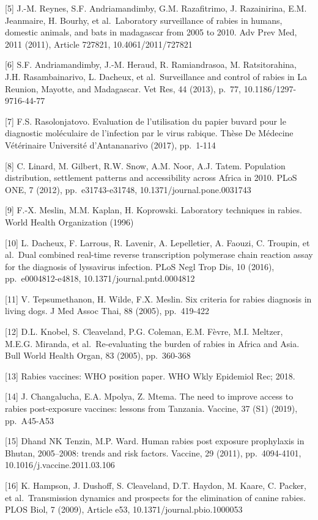 \documentclass[
  oneside]{book}
\begin{document}
{[}5{]} J.-M. Reynes, S.F. Andriamandimby, G.M. Razafitrimo, J. Razainirina, E.M. Jeanmaire, H. Bourhy, et al.~Laboratory surveillance of rabies in humans, domestic animals, and bats in madagascar from 2005 to 2010. Adv Prev Med, 2011 (2011), Article 727821, 10.4061/2011/727821

{[}6{]} S.F. Andriamandimby, J.-M. Heraud, R. Ramiandrasoa, M. Ratsitorahina, J.H. Rasambainarivo, L. Dacheux, et al.~Surveillance and control of rabies in La Reunion, Mayotte, and Madagascar. Vet Res, 44 (2013), p.~77, 10.1186/1297-9716-44-77

{[}7{]} F.S. Rasolonjatovo. Evaluation de l'utilisation du papier buvard pour le diagnostic moléculaire de l'infection par le virus rabique. Thèse De Médecine Vétérinaire Université d'Antananarivo (2017), pp.~1-114

{[}8{]} C. Linard, M. Gilbert, R.W. Snow, A.M. Noor, A.J. Tatem. Population distribution, settlement patterns and accessibility across Africa in 2010. PLoS ONE, 7 (2012), pp.~e31743-e31748, 10.1371/journal.pone.0031743

{[}9{]} F.-X. Meslin, M.M. Kaplan, H. Koprowski. Laboratory techniques in rabies. World Health Organization (1996)

{[}10{]} L. Dacheux, F. Larrous, R. Lavenir, A. Lepelletier, A. Faouzi, C. Troupin, et al.~Dual combined real-time reverse transcription polymerase chain reaction assay for the diagnosis of lyssavirus infection. PLoS Negl Trop Dis, 10 (2016), pp.~e0004812-e4818, 10.1371/journal.pntd.0004812

{[}11{]} V. Tepsumethanon, H. Wilde, F.X. Meslin. Six criteria for rabies diagnosis in living dogs. J Med Assoc Thai, 88 (2005), pp.~419-422

{[}12{]} D.L. Knobel, S. Cleaveland, P.G. Coleman, E.M. Fèvre, M.I. Meltzer, M.E.G. Miranda, et al.~Re-evaluating the burden of rabies in Africa and Asia. Bull World Health Organ, 83 (2005), pp.~360-368

{[}13{]} Rabies vaccines: WHO position paper. WHO Wkly Epidemiol Rec; 2018.

{[}14{]} J. Changalucha, E.A. Mpolya, Z. Mtema. The need to improve access to rabies post-exposure vaccines: lessons from Tanzania. Vaccine, 37 (S1) (2019), pp.~A45-A53

{[}15{]} Dhand NK Tenzin, M.P. Ward. Human rabies post exposure prophylaxis in Bhutan, 2005--2008: trends and risk factors. Vaccine, 29 (2011), pp.~4094-4101, 10.1016/j.vaccine.2011.03.106

{[}16{]} K. Hampson, J. Dushoff, S. Cleaveland, D.T. Haydon, M. Kaare, C. Packer, et al.~Transmission dynamics and prospects for the elimination of canine rabies. PLOS Biol, 7 (2009), Article e53, 10.1371/journal.pbio.1000053
\end{document}
